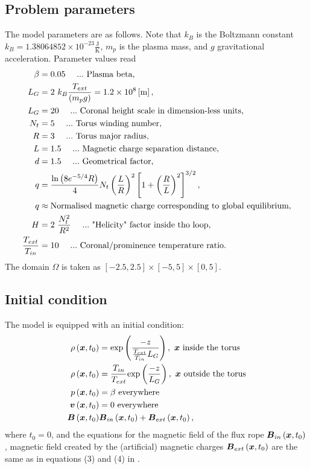 \subsection{Problem parameters}
The model parameters are as follows. Note that $k_B$ is the Boltzmann constant $k_B = 1.38064852 \times 10^{-23} \frac{\mathrm{J}}{\mathrm{K}}$, $m_p$ is the plasma mass, and $g$ gravitational acceleration. Parameter values read
\begin{align}
\nonumber \beta & =  0.05\ \ \ \ ...\ \text{Plasma beta},\\
\nonumber L_G & =  2\ k_B \frac{T_{ext}}{\lo m_p g \ro} = 1.2 \times 10^8 \left[\text{m}\right],\\
\nonumber L_G & =  20 \ \ \ \ ...\ \text{Coronal height scale in dimension-less units},\\
\nonumber N_t & = 5\ \ \ \ ...\ \text{Torus winding number},\\
\nonumber R & = 3\ \ \ \ ...\ \text{Torus major radius},\\
\nonumber L & = 1.5\ \ \ \ ...\ \text{Magnetic charge separation distance},\\
\nonumber d & =  1.5\ \ \ \ ...\ \text{Geometrical factor},\\
\nonumber q & =  \frac{\ln\lo 8 e^{-5/4} R\ro}{4} N_t \lo\frac{L}{R}\ro^2\left[1 + \lo\frac{R}{L}\ro^2\right]^{3/2},\\
\nonumber q & \approx \text{Normalised magnetic charge corresponding to global equilibrium},\\
\nonumber H & = 2\ \frac{N_t^2}{R^2}\ \ \ \ ...\ \text{"Helicity" factor inside tho loop},\\
\nonumber \frac{ T_{ext} }{T_{in}} & =  10\ \ \ \ ...\ \text{Coronal/prominence temperature ratio}.\\
\end{align}
The domain $\Omega$ is taken as $\left[-2.5, 2.5\right] \times \left[-5, 5\right] \times \left[0, 5\right]$.
\subsection{Initial condition}
The model is equipped with an initial condition:
\begin{align}
\rho\left(\mbox{\boldmath $x$}, t_0\right) & = \mathrm{exp}\left(\frac{-z}{\frac{ T_{ext} }{T_{in}}L_G}\right),\ \mbox{\boldmath $x$}\ \text{inside the torus}\\
\rho\left(\mbox{\boldmath $x$}, t_0\right) & = \frac{ T_{in} }{T_{ext}} \mathrm{exp}\left(\frac{-z}{L_G}\right),\ \mbox{\boldmath $x$}\ \text{outside the torus}\\
p\left(\mbox{\boldmath $x$}, t_0\right) & = \beta\ \text{everywhere}\\
\mbox{\boldmath $v$}\left(\mbox{\boldmath $x$}, t_0\right) & = 0\ \text{everywhere}\\
\mbox{\boldmath $B$}\left(\mbox{\boldmath $x$}, t_0\right) & \mbox{\boldmath $B$}_{in}\left(\mbox{\boldmath $x$}, t_0\right) + \mbox{\boldmath $B$}_{ext}\left(\mbox{\boldmath $x$}, t_0\right),
\end{align}
where $t_0 = 0$, and the equations for the magnetic field of the flux rope $\mbox{\boldmath $B$}_{in}\left(\mbox{\boldmath $x$}, t_0\right)$, magnetic field created by the (artificial) magnetic charges $\mbox{\boldmath $B$}_{ext}\left(\mbox{\boldmath $x$}, t_0\right)$ are the same as in equations (3) and (4) in \cite{miraClanek}.
